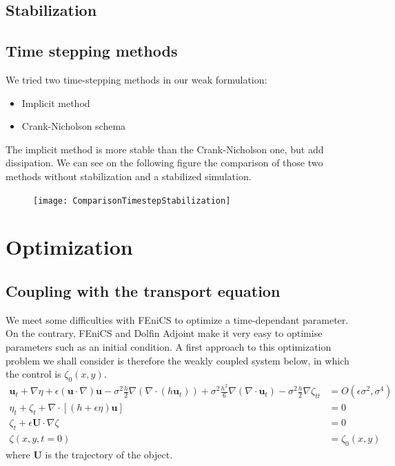 \documentclass[11pt,a4paper]{article}
\begin{document}
		\subsection{Stabilization}
			\pagebreak
		\subsection{Time stepping methods}
			We tried two time-stepping methods in our weak formulation:
			\begin{itemize}
				\item Implicit method
				\item Crank-Nicholson schema
			\end{itemize}
			The implicit method is more stable than the Crank-Nicholson one, but add dissipation. We can see on the following figure the comparison of those two methods without stabilization and a stabilized simulation.
			\begin{figure}[!h]
				 \texttt{[image: ComparisonTimestepStabilization]}
			\end{figure}
			
			\pagebreak				
	\section{Optimization}		
		\subsection{Coupling with the transport equation}
			We meet some difficulties with FEniCS to optimize a time-dependant parameter. On the contrary, FEniCS and Dolfin Adjoint make it very easy to optimise parameters	such as an initial condition. A first approach to this optimization problem we shall consider is therefore the weakly coupled system below, in which the control is $\zeta_0(x,y)$.
		\begin{align}
			\mathbf{u}_t + \nabla \eta + \epsilon (\mathbf{u} \cdot \nabla)\mathbf{u} - \sigma^2\frac{h}{2}\nabla (\nabla \cdot (h \mathbf{u}_t)) + \sigma^2 \frac{h^2}{6}\nabla (\nabla \cdot \mathbf{u}_t) - \sigma^2\frac{h}{2}\nabla \zeta_{tt}  &= O(\epsilon \sigma^2, \sigma^4)\\
			\eta_t+\zeta_t + \nabla \cdot [(h+\epsilon\eta)\mathbf{u}] &= 0 \\
			\zeta_t + \epsilon \mathbf{U} \cdot \nabla \zeta &= 0\\
			\zeta(x,y,t=0) &= \zeta_0(x,y)
		\end{align}
		where $\mathbf{U}$ is the trajectory of the object.
				
\end{document}

